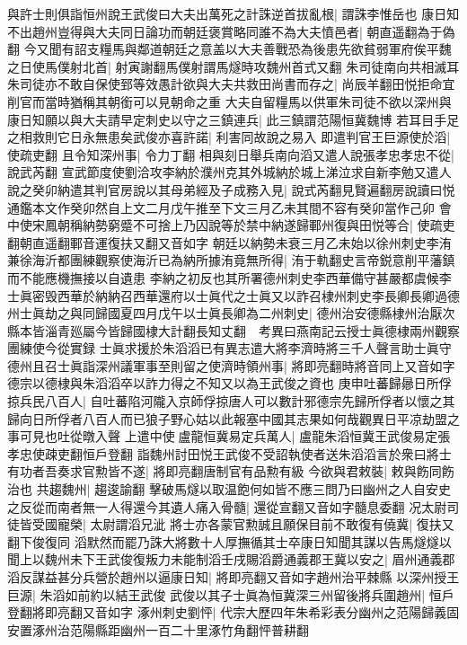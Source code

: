 與許士則俱詣恒州說王武俊曰大夫出萬死之計誅逆首拔亂根|{
	謂誅李惟岳也}
康日知不出趙州豈得與大夫同日論功而朝廷褒賞略同誰不為大夫憤邑者|{
	朝直遥翻為于偽翻}
今又聞有詔支糧馬與鄰道朝廷之意盖以大夫善戰恐為後患先欲貧弱軍府俟平魏之日使馬僕射北首|{
	射寅謝翻馬僕射謂馬燧時攻魏州首式又翻}
朱司徒南向共相滅耳朱司徒亦不敢自保使郅等效愚計欲與大夫共救田尚書而存之|{
	尚辰羊翻田悦拒命宜削官而當時猶稱其朝銜可以見朝命之重}
大夫自留糧馬以供軍朱司徒不欲以深州與康日知願以與大夫請早定刺史以守之三鎮連兵|{
	此三鎮謂范陽恒冀魏博}
若耳目手足之相救則它日永無患矣武俊亦喜許諾|{
	利害同故說之易入}
即遣判官王巨源使於滔|{
	使疏吏翻}
且令知深州事|{
	令力丁翻}
相與刻日舉兵南向滔又遣人說張孝忠孝忠不從|{
	說武芮翻}
宣武節度使劉洽攻李納於濮州克其外城納於城上涕泣求自新李勉又遣人說之癸卯納遣其判官房說以其母弟經及子成務入見|{
	說式芮翻見賢遍翻房說讀曰悦通鑑本文作癸卯然自上文二月戊午推至下文三月乙未其間不容有癸卯當作己卯}
會中使宋鳳朝稱納勢窮蹙不可捨上乃囚說等於禁中納遂歸鄆州復與田悦等合|{
	使疏吏翻朝直遥翻鄆音運復扶又翻又音如字}
朝廷以納勢未衰三月乙未始以徐州刺史李洧兼徐海沂都團練觀察使海沂已為納所據洧竟無所得|{
	洧于軌翻史言帝鋭意削平藩鎮而不能應機撫接以自遺患}
李納之初反也其所署德州刺史李西華備守甚嚴都虞候李士眞密毁西華於納納召西華還府以士眞代之士眞又以詐召棣州刺史李長卿長卿過德州士眞劫之與同歸國夏四月戊午以士眞長卿為二州刺史|{
	德州治安德縣棣州治厭次縣本皆淄青廵屬今皆歸國棣大計翻長知丈翻　考異曰燕南記云授士眞德棣兩州觀察團練使今從實録}
士眞求援於朱滔滔已有異志遣大將李濟時將三千人聲言助士眞守德州且召士眞詣深州議軍事至則留之使濟時領州事|{
	將即亮翻時將音同上又音如字德宗以德棣與朱滔滔卒以詐力得之不知又以為王武俊之資也}
庚申吐蕃歸曏日所俘掠兵民八百人|{
	自吐蕃陷河隴入京師俘掠唐人可以數計邪德宗先歸所俘者以懷之其歸向日所俘者八百人而已狼子野心姑以此報塞中國其志果如何哉觀異日平凉劫盟之事可見也吐從暾入聲}
上遣中使盧龍恒冀易定兵萬人|{
	盧龍朱滔恒冀王武俊易定張孝忠使疎吏翻恒戶登翻}
詣魏州討田悦王武俊不受詔執使者送朱滔滔言於衆曰將士有功者吾奏求官勲皆不遂|{
	將即亮翻唐制官有品勲有級}
今欲與君敕裝|{
	敕與飭同飭治也}
共趨魏州|{
	趨逡諭翻}
擊破馬燧以取温飽何如皆不應三問乃曰幽州之人自安史之反從而南者無一人得還今其遺人痛入骨髓|{
	還從宣翻又音如字髓息委翻}
况太尉司徒皆受國寵榮|{
	太尉謂滔兄泚}
將士亦各蒙官勲誠且願保目前不敢復有僥冀|{
	復扶又翻下俊復同}
滔默然而罷乃誅大將數十人厚撫循其士卒康日知聞其謀以告馬燧燧以聞上以魏州未下王武俊復叛力未能制滔壬戌賜滔爵通義郡王冀以安之|{
	眉州通義郡}
滔反謀益甚分兵營於趙州以逼康日知|{
	將即亮翻又音如字趙州治平棘縣}
以深州授王巨源|{
	朱滔如前約以結王武俊}
武俊以其子士眞為恒冀深三州留後將兵圍趙州|{
	恒戶登翻將即亮翻又音如字}
涿州刺史劉怦|{
	代宗大歷四年朱希彩表分幽州之范陽歸義固安置涿州治范陽縣距幽州一百二十里涿竹角翻怦普耕翻}
